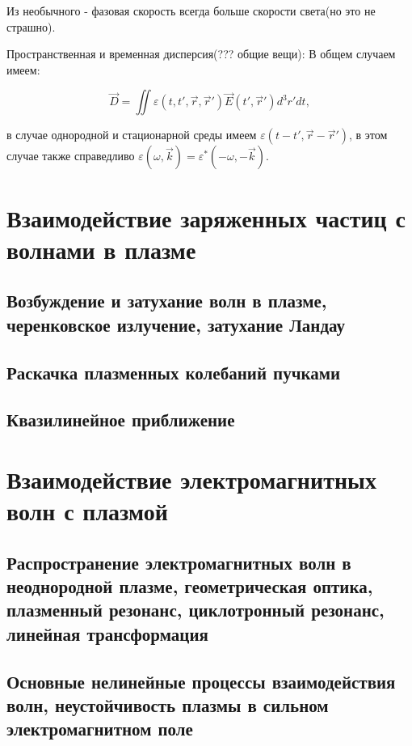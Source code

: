 \documentclass[10pt, a4paper]{article}
\let\stdsection\section
\renewcommand\section{\newpage\stdsection}
\begin{document}

Из необычного - фазовая скорость всегда больше скорости света(но это не страшно). 

Пространственная и временная дисперсия(??? общие вещи):
В общем случаем имеем:

\begin{equation}
    \overrightarrow{D}=\iint \varepsilon(t,t',\overrightarrow{r},\overrightarrow{r}') \overrightarrow{E}(t',\overrightarrow{r}') d^3 r' dt,
\end{equation}

в случае однородной и стационарной среды имеем $\varepsilon(t-t', \overrightarrow{r}-\overrightarrow{r}')$, в этом случае
также справедливо $\varepsilon(\omega, \overrightarrow{k})= \varepsilon^*(-\omega, -\overrightarrow{k})$.

\section{Взаимодействие заряженных частиц с волнами в плазме}

\subsection{Возбуждение и затухание волн в плазме, черенковское излучение, затухание Ландау}

\subsection{Раскачка плазменных колебаний пучками}

\subsection{Квазилинейное приближение}

\section{Взаимодействие электромагнитных волн с плазмой}

\subsection{Распространение электромагнитных волн в неоднородной плазме, геометрическая оптика, плазменный резонанс, циклотронный резонанс, линейная трансформация}

\subsection{Основные нелинейные процессы взаимодействия волн, неустойчивость плазмы в сильном электромагнитном поле}
\end{document}
